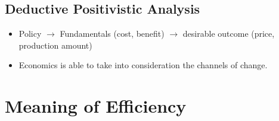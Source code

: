 \documentclass[
]{ltjarticle}
\begin{document}
\hypertarget{deductive-positivistic-analysis}{%
\subsection{Deductive Positivistic
Analysis}\label{deductive-positivistic-analysis}}

\begin{itemize}
\item
  Policy \(\to\) Fundamentals (cost, benefit) \(\to\) desirable outcome
  (price, production amount)
\item
  Economics is able to take into consideration the channels of change.
\end{itemize}

\hypertarget{meaning-of-efficiency}{%
\section{Meaning of Efficiency}\label{meaning-of-efficiency}}
\end{document}
